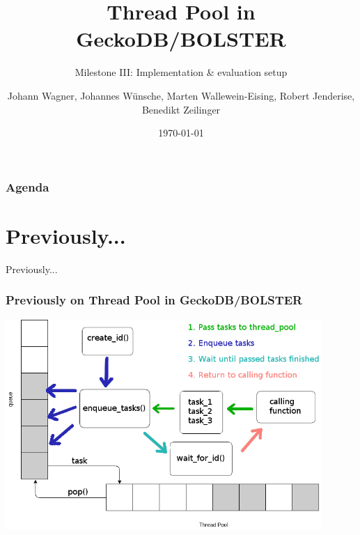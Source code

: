 \documentclass{beamer}
\title{Thread Pool in GeckoDB/BOLSTER}
\subtitle{Milestone III: Implementation \& evaluation setup}
\author{Johann Wagner, Johannes Wünsche, Marten Wallewein-Eising, Robert Jenderise, Benedikt Zeilinger}
\date{\today}
\institute{Otto von Guericke University, Magdeburg}
\begin{document}
\begin{frame}[plain]
 \titlepage
\end{frame}

\section[Agenda]{}
	\begin{frame}
	\frametitle{Agenda}
	\tableofcontents
	\end{frame}

\section{Previously...}
\begin{frame}
	\begin{center}
		\huge Previously...
	\end{center}
\end{frame}

\begin{frame}
	\frametitle{Previously on Thread Pool in GeckoDB/BOLSTER}
	\begin{center}
		\includegraphics[width=0.9\textwidth]{img/pool_queue.png}
	\end{center}
\end{frame}
\end{document}
